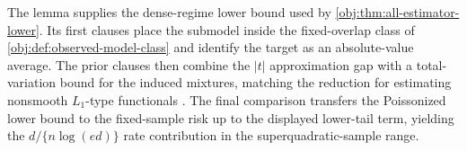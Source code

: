 
The lemma supplies the dense-regime lower bound used by \cref{obj:thm:all-estimator-lower}. Its first clauses place the submodel inside the fixed-overlap class of \cref{obj:def:observed-model-class} and identify the target as an absolute-value average. The prior clauses then combine the \(|t|\) approximation gap with a total-variation bound for the induced mixtures, matching the reduction for estimating nonsmooth \(L_1\)-type functionals \citep{CaiLow2011L1,JiaoHanWeissman2018L1}. The final comparison transfers the Poissonized lower bound to the fixed-sample risk up to the displayed lower-tail term, yielding the \(d/\{n\log(ed)\}\) rate contribution in the superquadratic-sample range.
